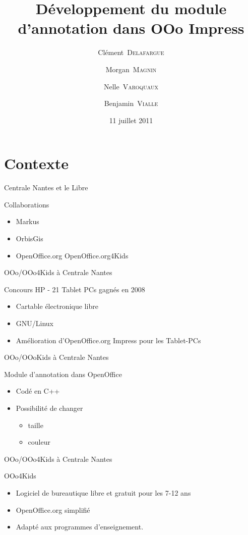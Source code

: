 \documentclass{beamer}
\title{Développement du module d'annotation dans OOo Impress}
\author{Clément~\textsc{Delafargue} \and Morgan~\textsc{Magnin} \and Nelle~\textsc{Varoquaux}\and Benjamin~\textsc{Vialle}}
\institute[\textsc{ECN}]{École Centrale de Nantes}
\date{11 juillet 2011}
\begin{document}
\frame{\titlepage}

\section{Contexte}

\begin{frame}{Centrale Nantes et le Libre}
    \begin{block}{Collaborations}
	\begin{itemize}[<+->]
	    \item Markus
	    \item OrbisGis
	    \item OpenOffice.org OpenOffice.org4Kids
	\end{itemize}
    \end{block}
\end{frame}

\begin{frame}{OOo/OOo4Kids à Centrale Nantes}
    \begin{block}{Concours HP - 21 Tablet PCs gagnés en 2008}
	\begin{itemize}[<+->]
	    \item Cartable électronique libre
            \item GNU/Linux
            \item Amélioration d'OpenOffice.org Impress pour les Tablet-PCs
	\end{itemize}
    \end{block}
\end{frame}

\begin{frame}{OOo/OOoKids à Centrale Nantes}
    \begin{block}{Module d'annotation dans OpenOffice}
	\begin{itemize}
	    \item Codé en C++
	    \item Possibilité de changer
	    \begin{itemize}
		\item taille
		\item couleur
	    \end{itemize}
	\end{itemize}
    \end{block}
\end{frame}

\begin{frame}{OOo/OOo4Kids à Centrale Nantes}
    \begin{block}{OOo4Kids}
	\begin{itemize}[<+->]
	    \item Logiciel de bureautique libre et gratuit pour les 7-12 ans
	    \item OpenOffice.org simplifié
	    \item Adapté aux programmes d'enseignement.
	\end{itemize}
    \end{block}
\end{frame}
\end{document}
